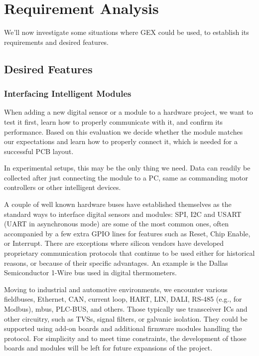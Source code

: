 \chapter{Requirement Analysis}

We'll now investigate some situations where GEX could be used, to establish its requirements and desired features.

\section{Desired Features}

\subsection{Interfacing Intelligent Modules}\label{sec:uses_digital_ifaces}

When adding a new digital sensor or a module to a hardware project, we want to test it first, learn how to properly communicate with it, and confirm its performance. Based on this evaluation we decide whether the module matches our expectations and learn how to properly connect it, which is needed for a successful \gls{PCB} layout.

In experimental setups, this may be the only thing we need. Data can readily be collected after just connecting the module to a \gls{PC}, same as commanding motor controllers or other intelligent devices.

A couple of well known hardware buses have established themselves as the standard ways to interface digital sensors and modules: \gls{SPI}, \gls{I2C} and \gls{USART} (\gls{UART} in asynchronous mode) are some of the most common ones, often accompanied by a few extra \gls{GPIO} lines for features such as Reset, Chip Enable, or Interrupt. There are exceptions where silicon vendors have developed proprietary communication protocols that continue to be used either for historical reasons, or because of their specific advantages. An example is the Dallas Semiconductor 1-Wire bus used in digital thermometers.

Moving to industrial and automotive environments, we encounter various fieldbuses, Ethernet, \gls{CAN}, current loop, \gls{HART}, \gls{LIN}, \gls{DALI}, RS-485 (e.g., for Modbus), \gls{mbus}, PLC-BUS, and others. Those typically use transceiver \glspl{IC} and other circuitry, such as \glspl{TVS}, signal filters, or galvanic isolation. They could be supported using add-on boards and additional firmware modules handling the protocol. For simplicity and to meet time constraints, the development of those boards and modules will be left for future expansions of the project.

